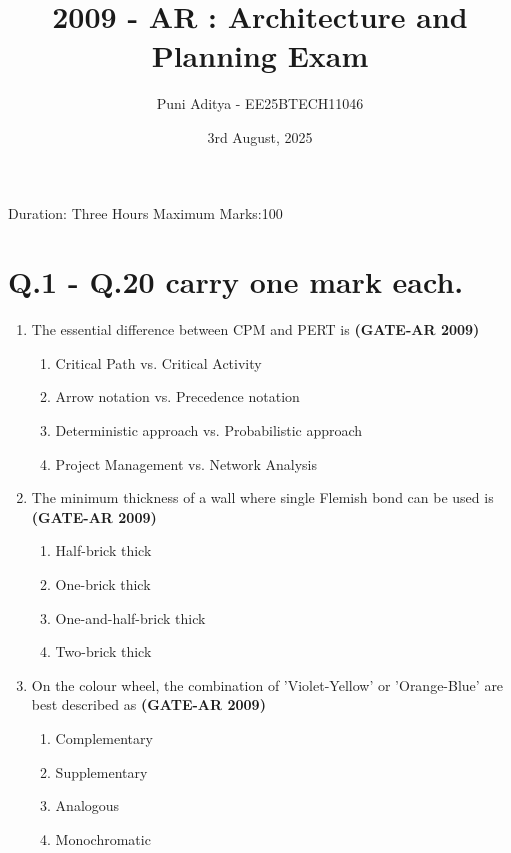 \documentclass[a4paper,10pt]{article}
\begin{document}
\title{2009 - AR : Architecture and Planning Exam}
\author{Puni Aditya - EE25BTECH11046}
\date{3rd August, 2025}
\maketitle
Duration: Three Hours \hfill Maximum Marks:100

\section*{Q.1 - Q.20 carry one mark each.}

\begin{enumerate}
    \item The essential difference between CPM and PERT is \hfill \textbf{(GATE-AR 2009)}
    \begin{enumerate}
        \item Critical Path vs. Critical Activity
        \item Arrow notation vs. Precedence notation
        \item Deterministic approach vs. Probabilistic approach
        \item Project Management vs. Network Analysis
    \end{enumerate}
    
    \item The minimum thickness of a wall where single Flemish bond can be used is \hfill \textbf{(GATE-AR 2009)}
    \begin{enumerate}
        \item Half-brick thick
        \item One-brick thick
        \item One-and-half-brick thick
        \item Two-brick thick
    \end{enumerate}
    
    \item On the colour wheel, the combination of 'Violet-Yellow' or 'Orange-Blue' are best described as \hfill \textbf{(GATE-AR 2009)}
    \begin{multicols}{4}
	\begin{enumerate}
        \item Complementary
        \item Supplementary
        \item Analogous
        \item Monochromatic
    \end{enumerate}
	\end{multicols}
    

\end{enumerate}
\end{document}
